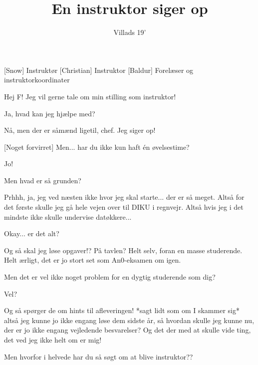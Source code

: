 \documentclass[a4paper,11pt]{article}
\title{En instruktor siger op}
\author{Villads 19'}
\begin{document}
\maketitle

\begin{roles}
[Snow] Instruktør
[Christian] Instruktor
[Baldur] Forelæser og instruktorkoordinater
\end{roles}


\begin{sketch}

 Hej F! Jeg vil gerne tale om min stilling som instruktor!

 Ja, hvad kan jeg hjælpe med? 

 Nå, men der er såmænd ligetil, chef. Jeg siger op!

[Noget forvirret] Men... har du ikke kun haft  én øvelsestime?


 Jo!

 Men hvad er så grunden?

 Prhhh, ja, jeg ved næsten ikke hvor jeg skal starte... der er så meget. Altså for det første skulle jeg gå hele vejen over til DIKU i regnvejr. Altså hvis jeg i det mindste ikke skulle undervise datøkkere... 


 Okay... er det alt?

 Og så skal jeg løse opgaver!? På tavlen? Helt selv, foran en masse studerende. Helt ærligt, det er jo stort set som An0-eksamen om igen.

 Men det er vel ikke noget problem for en dygtig studerende som dig?


 Vel?


 Og så spørger de om hints til afleveringen! *sagt lidt som om I skammer sig* altså jeg kunne jo ikke engang løse dem sidste år, så hvordan skulle jeg kunne nu, der er jo ikke engang vejledende besvarelser? Og det der med at skulle vide ting, det ved jeg ikke helt om er mig!


 Men hvorfor i helvede har du så søgt om at blive instruktor?? 


\end{sketch}
\end{document}
